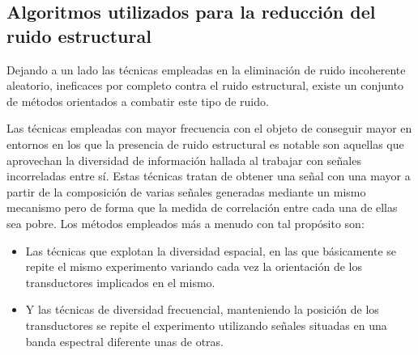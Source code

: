 \subsection{Algoritmos utilizados para la reducción del ruido estructural}

Dejando a un lado las técnicas empleadas en la eliminación de ruido incoherente aleatorio, ineficaces por completo contra el ruido estructural, existe un conjunto de métodos orientados a combatir este tipo de ruido.\par
Las técnicas empleadas con mayor frecuencia con el objeto de conseguir mayor  en entornos en los que la presencia de ruido estructural es notable son aquellas que aprovechan la diversidad de información hallada al trabajar con señales incorreladas entre sí. Estas técnicas tratan de obtener una señal con una mayor  a partir de la composición de varias señales generadas mediante un mismo mecanismo pero de forma que la medida de correlación entre cada una de ellas sea pobre. Los métodos empleados más a menudo con tal propósito son:

\begin{itemize}
	\item Las técnicas que explotan la diversidad espacial, en las que básicamente se repite el mismo experimento variando cada vez la orientación de los transductores implicados en el mismo.
	\item Y las técnicas de diversidad frecuencial, manteniendo la posición de los transductores se repite el experimento utilizando señales situadas en una banda espectral diferente unas de otras.
\end{itemize}

